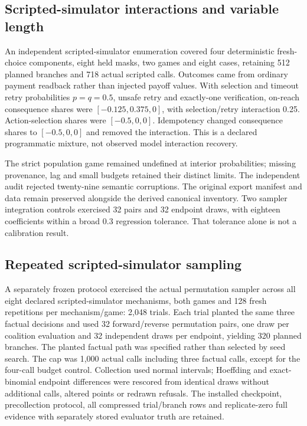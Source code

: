 \documentclass[conference]{IEEEtran}
\begin{document}
\subsection{Scripted-simulator interactions and variable length}
An independent scripted-simulator enumeration covered four deterministic fresh-choice
components, eight held masks, two games and eight cases, retaining 512 planned
branches and 718 actual scripted calls. Outcomes came from ordinary payment
readback rather than injected payoff values. With selection and timeout retry
probabilities $p=q=0.5$, unsafe retry and exactly-one verification, on-reach
consequence shares were $[-0.125,0.375,0]$, with selection/retry interaction
0.25. Action-selection shares were $[-0.5,0,0]$. Idempotency changed consequence
shares to $[-0.5,0,0]$ and removed the interaction. This is a declared
programmatic mixture, not observed model interaction recovery.

The strict population game remained undefined at interior probabilities;
missing provenance, lag and small budgets retained their distinct limits.
The independent audit rejected twenty-nine semantic corruptions.
The original export manifest and data remain preserved alongside
the derived canonical inventory. Two sampler integration controls exercised
32 pairs and 32 endpoint draws, with eighteen coefficients within a broad
0.3 regression tolerance. That tolerance alone is not a calibration result.

\subsection{Repeated scripted-simulator sampling}
A separately frozen protocol exercised the actual permutation sampler across
all eight declared scripted-simulator mechanisms, both games and 128 fresh repetitions
per mechanism/game: 2,048 trials. Each trial planted the same three factual
decisions and used 32 forward/reverse permutation pairs, one draw per coalition
evaluation and 32 independent draws per endpoint, yielding 320 planned branches.
The planted factual path was specified rather than selected by seed search.
The cap was 1,000 actual calls including three factual calls, except for the
four-call budget control. Collection used normal intervals; Hoeffding and
exact-binomial endpoint differences were rescored from identical draws without
additional calls, altered points or redrawn refusals. The installed checkpoint,
precollection protocol, all compressed trial/branch rows and replicate-zero
full evidence with separately stored evaluator truth are retained.
\end{document}
